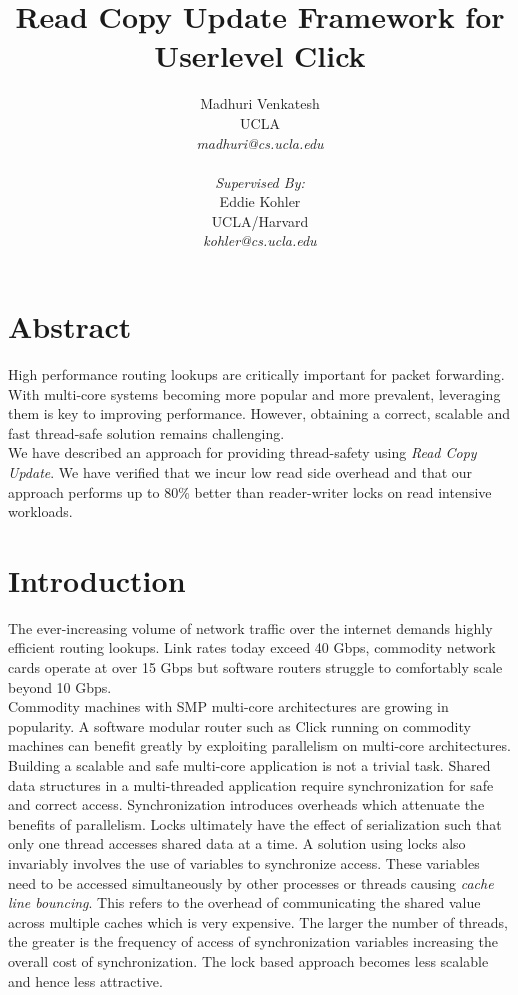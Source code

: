 \documentclass[a4paper,marginparwidth=50pt,marginparsep=10pt]{article}
\begin{document}
\author { 
Madhuri Venkatesh 
\\ UCLA 
\\ \textsl{madhuri@cs.ucla.edu}
\\
\\
\textsl{Supervised By:}
\\Eddie Kohler 
\\ UCLA/Harvard
\\ \textsl{kohler@cs.ucla.edu}
}
\title{Read Copy Update Framework for Userlevel Click}
\maketitle

\pagebreak
\section{Abstract}
High performance routing lookups are critically important for packet forwarding. With multi-core systems becoming more popular and more prevalent, leveraging them is key to improving performance. However, obtaining a correct, scalable and fast thread-safe solution remains challenging.\\

We have described an approach for providing thread-safety using \emph{Read Copy Update}. We have verified that we incur low read side overhead and that our approach performs up to 80\% better than reader-writer locks on read intensive workloads.
\section{Introduction}
The ever-increasing volume of network traffic over the internet demands highly efficient routing lookups. Link rates today exceed 40 Gbps, commodity network cards operate at over 15 Gbps but software routers struggle to comfortably scale beyond 10 Gbps\cite{routebricks}.\\

Commodity machines with SMP multi-core architectures are growing in popularity. A software modular router such as Click\cite{click} running on commodity machines  can benefit greatly by exploiting parallelism on multi-core architectures.\\

Building a scalable and safe multi-core application is not a trivial task. Shared data structures in a multi-threaded application require synchronization for safe and correct access. Synchronization introduces overheads which attenuate the benefits of parallelism. Locks ultimately have the effect of  serialization such that only one thread accesses shared data at a time. A solution using locks also invariably involves the use of variables to synchronize access. These variables need to be accessed simultaneously by other processes or threads causing \emph{cache line bouncing}. This refers to the overhead of communicating the shared value across multiple caches which is very expensive. The larger the number of threads, the greater is the frequency of access of synchronization variables increasing the overall cost of synchronization. The lock based approach becomes less scalable and hence less attractive.\\
\end{document}
